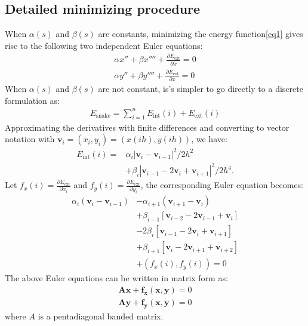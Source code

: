 \documentclass[journal]{IEEEtran}
\begin{document}
\subsection{Detailed minimizing procedure}
When $\alpha(s)$ and $\beta(s)$ are constants, minimizing the energy function\ref{eq1} gives rise to the following two independent Euler equations:
\begin{equation}\begin{aligned}
\alpha x''+\beta x''''+\frac{\partial E_{\text{ext}}}{\partial x}=0\\
\alpha y''+\beta y''''+\frac{\partial E_{\text{ext}}}{\partial x}=0
\end{aligned}\end{equation} 
When $\alpha(s)$ and $\beta(s)$ are not constant, is's simpler to go directly to a discrete formulation as:
\begin{equation}\begin{aligned}
E_{\text{snake}}=\sum_{i=1}^n E_{\text{int}}(i)+E_{\text{ext}}(i)
\end{aligned}\end{equation}
Approximating the derivatives with finite differences and converting to vector notation with $\mathbf{v}_i=(x_i,y_i)=(x(ih),y(ih))$, we have:
\begin{equation}\begin{aligned}
E_{\text{int}}(i)=&\alpha_i |\mathbf{v}_i-\mathbf{v}_{i-1}|^2/2h^2\\
&+\beta_i|\mathbf{v}_{i-1}-2\mathbf{v}_i+\mathbf{v}_{i+1}|^2/2h^4.
\end{aligned}\end{equation}
Let $f_x(i)=\frac{\partial E_{\text{ext}}}{\partial x_i}$ and $f_y(i)=\frac{\partial E_{\text{ext}}}{\partial y_i}$, the corresponding Euler equation becomes:
\begin{equation}\begin{aligned}
    \alpha_{i}\left(\mathbf{v}_{i}-\mathbf{v}_{i-1}\right)&- \alpha_{i+1}\left(\mathbf{v}_{i+1}-\mathbf{v}_{i}\right) \\
    &+\beta_{i-1}\left[\mathbf{v}_{i-2}-2 \mathbf{v}_{i-1}+\mathbf{v}_{i}\right] \\
    &-2 \beta_{i}\left[\mathbf{v}_{i-1}-2 \mathbf{v}_{i}+\mathbf{v}_{i+1}\right] \\
    &+\beta_{i+1}\left[\mathbf{v}_{i}-2 \mathbf{v}_{i+1}+\mathbf{v}_{i+2}\right] \\
    &+\left(f_{x}(i), f_{y}(i)\right)=0
\end{aligned}\end{equation}
The above Euler equations can be written in matrix form as:
\begin{equation}\begin{aligned}
\mathbf{Ax+f_x(x,y)}=0\\
\mathbf{Ay+f_y(x,y)}=0 \label{eq2}
\end{aligned}\end{equation}
where $A$ is a pentadiagonal banded matrix.
\end{document}
